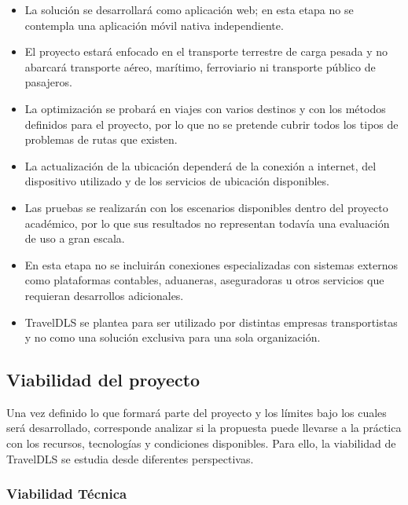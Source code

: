 \begin{itemize}
	\item La solución se desarrollará como aplicación web; en esta etapa no se contempla una aplicación móvil nativa independiente.
	\item El proyecto estará enfocado en el transporte terrestre de carga pesada y no abarcará transporte aéreo, marítimo, ferroviario ni transporte público de pasajeros.
	\item La optimización se probará en viajes con varios destinos y con los métodos definidos para el proyecto, por lo que no se pretende cubrir todos los tipos de problemas de rutas que existen.
	\item La actualización de la ubicación dependerá de la conexión a internet, del dispositivo utilizado y de los servicios de ubicación disponibles.
	\item Las pruebas se realizarán con los escenarios disponibles dentro del proyecto académico, por lo que sus resultados no representan todavía una evaluación de uso a gran escala.
	\item En esta etapa no se incluirán conexiones especializadas con sistemas externos como plataformas contables, aduaneras, aseguradoras u otros servicios que requieran desarrollos adicionales.
	\item TravelDLS se plantea para ser utilizado por distintas empresas transportistas y no como una solución exclusiva para una sola organización.
\end{itemize}

\subsection{Viabilidad del proyecto}
\label{sec:viabilidad}

Una vez definido lo que formará parte del proyecto y los límites bajo los cuales será desarrollado, corresponde analizar si la propuesta puede llevarse a la práctica con los recursos, tecnologías y condiciones disponibles. Para ello, la viabilidad de TravelDLS se estudia desde diferentes perspectivas.

\subsubsection{Viabilidad Técnica}

